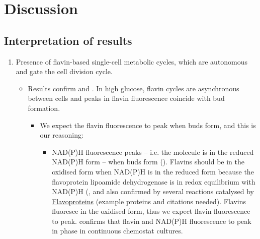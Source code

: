 \section{Discussion}
\label{sec:biology-discussion}

\subsection{Interpretation of results}
\label{subsec:biology-discussion-interpretation}
\begin{enumerate}
\item Presence of flavin-based single-cell metabolic cycles, which are autonomous and gate the cell division cycle.
\begin{itemize}
\item Results confirm \cite{papagiannakisAutonomousMetabolicOscillations2017} and \cite{baumgartnerFlavinbasedMetabolicCycles2018}.  In high glucose, flavin cycles are asynchronous between cells and peaks in flavin fluorescence coincide with bud formation.
\begin{itemize}
\item We expect the flavin fluorescence to peak when buds form, and this is our reasoning:
\begin{itemize}
\item NAD(P)H fluorescence peaks -- i.e. the molecule is in the reduced NAD(P)H form -- when buds form (\cite{papagiannakisAutonomousMetabolicOscillations2017}).  Flavins should be in the oxidised form when NAD(P)H is in the reduced form because the flavoprotein lipoamide dehydrogenase is in redox equilibrium with NAD(P)H (\cite{sianoNADHFlavinFluorescence1989}, and also confirmed by several reactions catalysed by \href{Flavoproteins.org}{Flavoproteins} (example proteins and citations needed).  Flavins fluoresce in the oxidised form, thus we expect flavin fluorescence to peak. \cite{murrayRedoxRegulationRespiring2011} confirms that flavin and NAD(P)H fluorescence to peak in phase in continuous chemostat cultures.
\end{itemize}


\end{itemize}
\end{itemize}
\end{enumerate}
